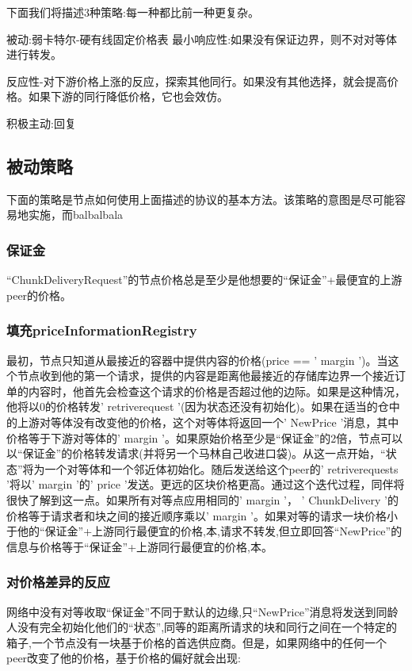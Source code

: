 下面我们将描述3种策略:每一种都比前一种更复杂。

被动:弱卡特尔-硬有线固定价格表
最小响应性:如果没有保证边界，则不对对等体进行转发。 

反应性-对下游价格上涨的反应，探索其他同行。如果没有其他选择，就会提高价格。如果下游的同行降低价格，它也会效仿。

积极主动:回复 


\subsection{被动策略\statusorange}\label{sec:pricing-retrieval}
下面的策略是节点如何使用上面描述的协议的基本方法。该策略的意图是尽可能容易地实施，而balbalbala

\subsubsection{保证金}
“ChunkDeliveryRequest”的节点价格总是至少是他想要的“保证金”+最便宜的上游peer的价格。 

\subsubsection{填充priceInformationRegistry}
最初，节点只知道从最接近的容器中提供内容的价格(price == ' margin ')。当这个节点收到他的第一个请求，提供的内容是距离他最接近的存储库边界一个接近订单的内容时，他首先会检查这个请求的价格是否超过他的边际。如果是这种情况，他将以0的价格转发' retriverequest '(因为状态还没有初始化)。如果在适当的仓中的上游对等体没有改变他的价格，这个对等体将返回一个' NewPrice '消息，其中价格等于下游对等体的' margin '。如果原始价格至少是“保证金”的2倍，节点可以以“保证金”的价格转发请求(并将另一个马林自己收进口袋)。从这一点开始，“状态”将为一个对等体和一个邻近体初始化。随后发送给这个peer的' retriverequests '将以' margin '的' price '发送。更远的区块价格更高。通过这个迭代过程，同伴将很快了解到这一点。如果所有对等点应用相同的' margin '， ' ChunkDelivery '的价格等于请求者和块之间的接近顺序乘以' margin '。如果对等的请求一块价格小于他的“保证金”+上游同行最便宜的价格,本,请求不转发,但立即回答“NewPrice”的信息与价格等于“保证金”+上游同行最便宜的价格,本。

\subsubsection{对价格差异的反应}
网络中没有对等收取“保证金”不同于默认的边缘,只“NewPrice”消息将发送到同龄人没有完全初始化他们的“状态”,同等的距离所请求的块和同行之间在一个特定的箱子,一个节点没有一块基于价格的首选供应商。但是，如果网络中的任何一个peer改变了他的价格，基于价格的偏好就会出现:


